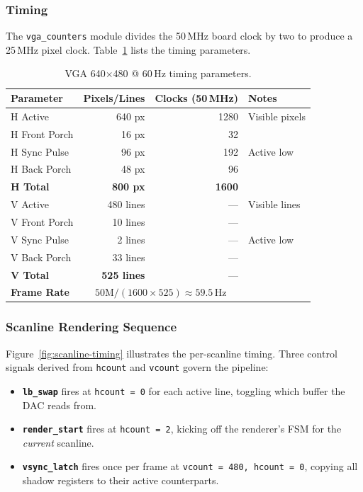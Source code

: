 \documentclass[11pt,letterpaper]{article}
\begin{document}
\subsubsection{Timing}

The \texttt{vga\_counters} module divides the 50\,MHz board clock by two
to produce a 25\,MHz pixel clock. Table~\ref{tab:vga-timing} lists the
timing parameters.

\begin{table}[H]
\centering
\caption{VGA 640$\times$480 @ 60\,Hz timing parameters.}
\label{tab:vga-timing}
\begin{tabular}{l r r l}
\toprule
\textbf{Parameter}   & \textbf{Pixels/Lines} & \textbf{Clocks (50\,MHz)} & \textbf{Notes} \\
\midrule
H Active             & 640 px    & 1280  & Visible pixels \\
H Front Porch        & 16 px     & 32    & \\
H Sync Pulse         & 96 px     & 192   & Active low \\
H Back Porch         & 48 px     & 96    & \\
\textbf{H Total}     & \textbf{800 px} & \textbf{1600} & \\
\midrule
V Active             & 480 lines & ---   & Visible lines \\
V Front Porch        & 10 lines  & ---   & \\
V Sync Pulse         & 2 lines   & ---   & Active low \\
V Back Porch         & 33 lines  & ---   & \\
\textbf{V Total}     & \textbf{525 lines} & --- & \\
\midrule
\textbf{Frame Rate}  & \multicolumn{2}{c}{$50\text{M} / (1600 \times 525) \approx 59.5$\,Hz} & \\
\bottomrule
\end{tabular}
\end{table}

\subsubsection{Scanline Rendering Sequence}

Figure~\ref{fig:scanline-timing} illustrates the per-scanline timing.
Three control signals derived from \texttt{hcount} and \texttt{vcount}
govern the pipeline:

\begin{itemize}[nosep]
  \item \textbf{\texttt{lb\_swap}} fires at \texttt{hcount\,=\,0} for
    each active line, toggling which buffer the DAC reads from.
  \item \textbf{\texttt{render\_start}} fires at \texttt{hcount\,=\,2},
    kicking off the renderer's FSM for the \emph{current} scanline.
  \item \textbf{\texttt{vsync\_latch}} fires once per frame at
    \texttt{vcount\,=\,480, hcount\,=\,0}, copying all shadow registers
    to their active counterparts.
\end{itemize}
\end{document}
